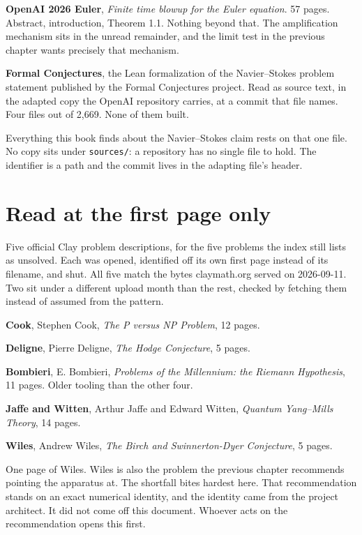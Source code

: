 \textbf{OpenAI 2026 Euler}, \emph{Finite time blowup for the Euler equation}. 57 pages. Abstract,
introduction, Theorem 1.1. Nothing beyond that. The amplification mechanism sits in the unread
remainder, and the limit test in the previous chapter wants precisely that mechanism.

\textbf{Formal Conjectures}, the Lean formalization of the Navier--Stokes problem statement
published by the Formal Conjectures project. Read as source text, in the adapted copy the OpenAI
repository carries, at a commit that file names. Four files out of 2{,}669. None of them built.

Everything this book finds about the Navier--Stokes claim rests on that one file. No copy sits under
\texttt{sources/}: a repository has no single file to hold. The identifier is a path and the
commit lives in the adapting file's header.

\section{Read at the first page only}

Five official Clay problem descriptions, for the five problems the index still lists as unsolved.
Each was opened, identified off its own first page instead of its filename, and shut. All five match
the bytes claymath.org served on 2026-09-11. Two sit under a different upload month than the rest,
checked by fetching them instead of assumed from the pattern.

\textbf{Cook}, Stephen Cook, \emph{The P versus NP Problem}, 12 pages.

\textbf{Deligne}, Pierre Deligne, \emph{The Hodge Conjecture}, 5 pages.

\textbf{Bombieri}, E. Bombieri, \emph{Problems of the Millennium: the Riemann Hypothesis}, 11
pages. Older tooling than the other four.

\textbf{Jaffe and Witten}, Arthur Jaffe and Edward Witten, \emph{Quantum Yang--Mills Theory}, 14
pages.

\textbf{Wiles}, Andrew Wiles, \emph{The Birch and Swinnerton-Dyer Conjecture}, 5 pages.

One page of Wiles. Wiles is also the problem the previous chapter recommends pointing the apparatus
at. The shortfall bites hardest here. That recommendation stands on an exact numerical identity,
and the identity came from the project architect. It did not come off this document. Whoever acts on
the recommendation opens this first.

